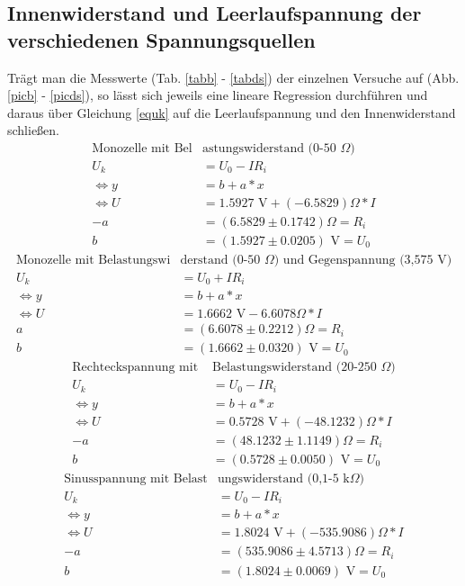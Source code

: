 
\subsection{Innenwiderstand und Leerlaufspannung der verschiedenen Spannungsquellen}
Trägt man die Messwerte (Tab. \ref{tabb} - \ref{tabds}) der einzelnen Versuche 
auf (Abb. \ref{picb} - \ref{picds}), so lässt sich jeweils eine lineare Regression \cite{linreg}
durchführen und daraus über Gleichung \ref{equk} auf die Leerlaufspannung und den Innenwiderstand
schließen. 
\begin{align}
\text{Monozelle mit Bel}&\text{astungswiderstand (0-50 $\Omega$)} \nonumber \\
U_k&=U_0-I R_i \\
\Leftrightarrow y&=b+a*x \\
\Leftrightarrow U&=1.5927\text{ V}+(-6.5829)\Omega*I \\
-a&=(6.5829\pm 0.1742)\Omega=R_i \label{eqrib}\\
b&=(1.5927\pm 0.0205)\text{ V}=U_0 \label{equob}
\end{align}
\begin{align}
\text{Monozelle mit Belastungswi}&\text{derstand (0-50 $\Omega$) und Gegenspannung (3,575 V)} \nonumber \\
U_k&=U_0+I R_i \\
\Leftrightarrow y&=b+a*x \\
\Leftrightarrow U&=1.6662\text{ V}-6.6078\Omega*I \\
a&=(6.6078\pm 0.2212)\Omega=R_i\\
b&=(1.6662\pm 0.0320)\text{ V}=U_0
\end{align}
\begin{align}
\text{Rechteckspannung mit }&\text{Belastungswiderstand (20-250 $\Omega$)} \nonumber \\
U_k&=U_0-I R_i \\
\Leftrightarrow y&=b+a*x \\
\Leftrightarrow U&=0.5728\text{ V}+(-48.1232)\Omega*I \\
-a&=(48.1232\pm 1.1149)\Omega=R_i\\
b&=(0.5728\pm 0.0050)\text{ V}=U_0
\end{align}
\begin{align}
\text{Sinusspannung mit Belast}&\text{ungswiderstand (0,1-5 k$\Omega$)} \nonumber \\
U_k&=U_0-I R_i \\
\Leftrightarrow y&=b+a*x \\
\Leftrightarrow U&=1.8024\text{ V}+(-535.9086)\Omega*I \\
-a&=(535.9086\pm 4.5713)\Omega=R_i\\
b&=(1.8024\pm 0.0069)\text{ V}=U_0
\end{align}
        
\FloatBarrier

